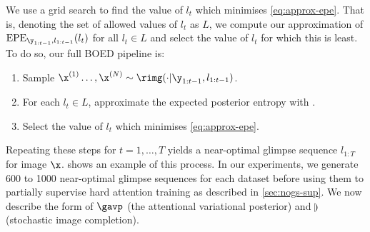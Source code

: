  We use a grid search to find the value
of $l_t$ which minimises \cref{eq:approx-epe}. That is, denoting the set of
allowed values of $l_t$ as $L$, we compute our approximation of
$\text{EPE}_{\y_{1:t-1}, l_{1:t-1}} (l_t)$ for all $l_t \in L$ and select the
value of $l_t$ for which this is least. To do so, our full BOED pipeline is:
\begin{enumerate}[itemsep=0pt, topsep=0pt]
\item Sample $\x^{(1)}\ldots,\x^{(N)} \sim \rimg(\cdot|\y_{1:t-1},l_{1:t-1})$.
\item For each $l_t \in L$, approximate the expected posterior entropy with
  .
\item Select the value of $l_t$ which minimises \cref{eq:approx-epe}.
\end{enumerate}
Repeating these steps for $t = 1,\ldots,T$ yields a near-optimal glimpse
sequence $l_{1:T}$ for image $\x$.  shows an example of this
process. In our experiments, we generate 600 to 1000 near-optimal glimpse sequences for each
dataset before using them to partially supervise hard attention training as
described in \cref{sec:nogs-sup}. We now describe the form of $\gavp$ (the
attentional variational posterior) and $\rimg$ (stochastic image completion).


